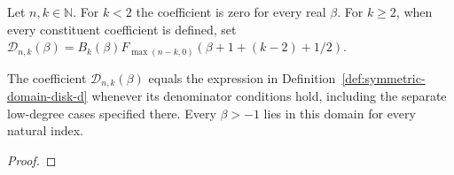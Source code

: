 \begin{supporting}
\begin{definition}
\label{def:symmetric-domain-disk-d}
\leanok
Let $n,k\in\mathbb N$. For $k<2$ the coefficient is zero for every real $\beta$. For $k\ge2$, when every constituent coefficient is defined, set $\mathcal D_{n,k}(\beta)=B_k(\beta)F_{\max(n-k,0)}(\beta+1+(k-2)+1/2)$.
\end{definition}

\begin{theorem}
\label{thm:symmetric-domain-disk-d}
\leanok
The coefficient $\mathcal D_{n,k}(\beta)$ equals the expression in Definition~\ref{def:symmetric-domain-disk-d} whenever its denominator conditions hold, including the separate low-degree cases specified there.
Every $\beta>-1$ lies in this domain for every natural index.
\end{theorem}
\begin{proof}
\leanok
\end{proof}
\end{supporting}


